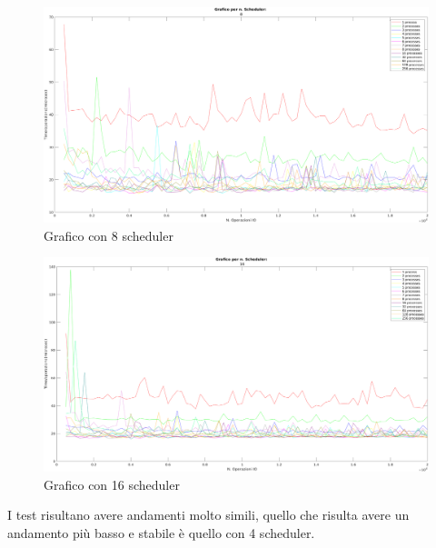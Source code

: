 \begin{figure}[!htp]
    \centering
    \includegraphics[keepaspectratio=true,scale=0.33]{images/matlab/concorrenza_io/8_IO.png}
	\caption{Grafico con 8 scheduler}
  	\label{fig:8_schedulerIO}
\end{figure}

\begin{figure}[!htp]
    \centering
    \includegraphics[keepaspectratio=true,scale=0.33]{images/matlab/concorrenza_io/16_IO.png}
	\caption{Grafico con 16 scheduler}
  	\label{fig:16_schedulerIO}
\end{figure}

I test risultano avere andamenti molto simili, quello che risulta
avere un andamento più basso e stabile
è quello con 4 scheduler.


